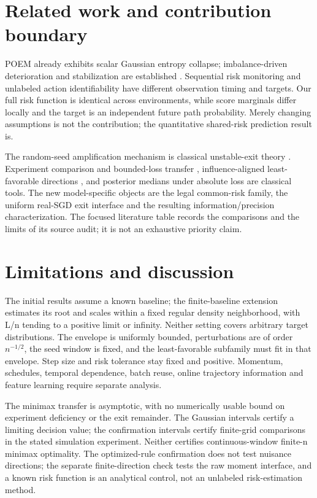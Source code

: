 \section{Related work and contribution boundary}\label{related-work-and-contribution-boundary}

POEM \cite[3.2]{bar2024poem} already exhibits scalar Gaussian entropy collapse; imbalance-driven deterioration and stabilization are established \cite{weerasinghe2026}. Sequential risk monitoring \cite{schirmer2025} and unlabeled action identifiability \cite{jhawar2026} have different observation timing and targets. Our full risk function is identical across environments, while score marginals differ locally and the target is an independent future path probability. Merely changing assumptions is not the contribution; the quantitative shared-risk prediction result is.

The random-seed amplification mechanism is classical unstable-exit theory \cite{bakhtin2008}. Experiment comparison and bounded-loss transfer \cite{nussbaum2004}, influence-aligned least-favorable directions \cite{vanderlaan2016}, and posterior medians under absolute loss are classical tools. The new model-specific objects are the legal common-risk family, the uniform real-SGD exit interface and the resulting information/precision characterization. The focused literature table records the comparisons and the limits of its source audit; it is not an exhaustive priority claim.

\section{Limitations and discussion}\label{limitations-and-discussion}

The initial results assume a known baseline; the finite-baseline extension estimates its root and scales within a fixed regular density neighborhood, with L/n tending to a positive limit or infinity. Neither setting covers arbitrary target distributions. The envelope is uniformly bounded, perturbations are of order \(n^{-1/2}\), the seed window is fixed, and the least-favorable subfamily must fit in that envelope. Step size and risk tolerance stay fixed and positive. Momentum, schedules, temporal dependence, batch reuse, online trajectory information and feature learning require separate analysis.

The minimax transfer is asymptotic, with no numerically usable bound on experiment deficiency or the exit remainder. The Gaussian intervals certify a limiting decision value; the confirmation intervals certify finite-grid comparisons in the stated simulation experiment. Neither certifies continuous-window finite-n minimax optimality. The optimized-rule confirmation does not test nuisance directions; the separate finite-direction check tests the raw moment interface, and a known risk function is an analytical control, not an unlabeled risk-estimation method.

